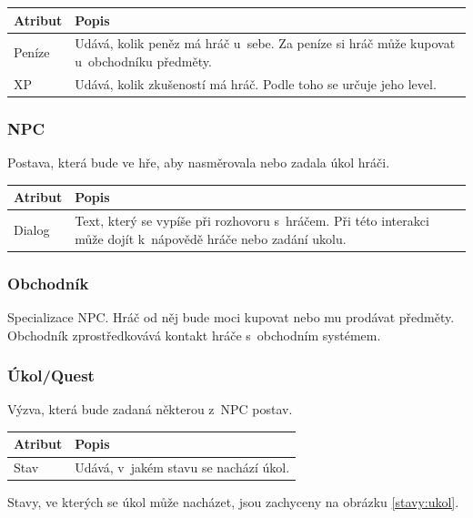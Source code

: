 \documentclass[12pt,a4paper]{article}
\begin{document}
\noindent
\begin{tabularx}{\textwidth}{|l|>{\raggedright}X|}
\hline
\cellcolor{black!80}\textcolor{gray!25}{\textbf{Atribut}} & \cellcolor{black!80}\textcolor{gray!20}{\textbf{Popis}}\tabularnewline \hline
 Peníze & Udává, kolik peněz má hráč u~sebe. Za peníze si hráč může
             kupovat u~obchodníku předměty. \tabularnewline
\hline
 XP & Udává, kolik zkušeností má hráč. Podle toho se určuje jeho
  level.
\tabularnewline\hline
\end{tabularx}

\subsubsection{NPC}
Postava, která bude ve hře, aby nasměrovala nebo zadala úkol hráči.

\noindent
\begin{tabularx}{\textwidth}{|l|>{\raggedright}X|}
\hline
\cellcolor{black!80}\textcolor{gray!25}{\textbf{Atribut}} & \cellcolor{black!80}\textcolor{gray!20}{\textbf{Popis}}\tabularnewline \hline
 Dialog & Text, který se vypíše při rozhovoru s~hráčem. Při této interakci
může dojít k~nápovědě hráče nebo zadání ukolu.
\tabularnewline\hline
\end{tabularx}

\subsubsection{Obchodník}
Specializace NPC. Hráč od něj bude moci kupovat nebo mu prodávat předměty.
Obchodník zprostředkovává kontakt hráče s~obchodním systémem.

\subsubsection{Úkol/Quest}
Výzva, která bude zadaná některou z~NPC postav.

\noindent
\begin{tabularx}{\textwidth}{|l|>{\raggedright}X|}
\hline
\cellcolor{black!80}\textcolor{gray!25}{\textbf{Atribut}} & \cellcolor{black!80}\textcolor{gray!20}{\textbf{Popis}}\tabularnewline \hline
 Stav & Udává, v~jakém stavu se nachází úkol.
\tabularnewline\hline
\end{tabularx}

\bigskip
\noindent
Stavy, ve kterých se úkol může nacházet, jsou zachyceny na obrázku
\ref{stavy:ukol}.
\end{document}
